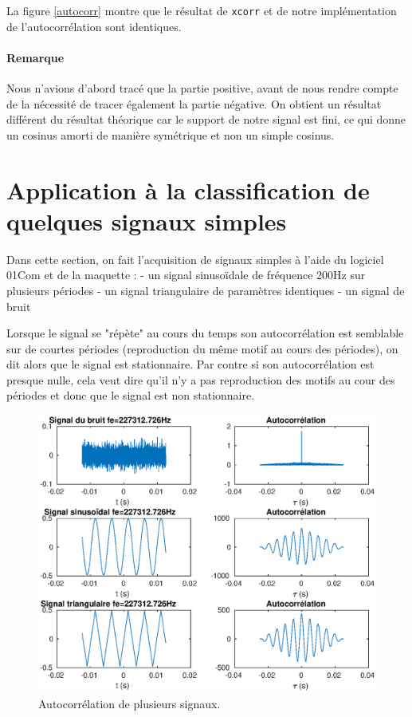 \documentclass[french]{article}
\begin{document}
La figure \ref{autocorr} montre que le résultat de \verb`xcorr` et de notre implémentation de l'autocorrélation sont identiques.

\paragraph{Remarque}
Nous n'avions d'abord tracé que la partie positive, avant de nous rendre compte de la nécessité de tracer également la partie négative.
On obtient un résultat différent du résultat théorique car le support de notre signal est fini, ce qui donne un cosinus amorti de manière symétrique et non un simple cosinus.

\section{ Application à la classification de quelques signaux simples}


Dans cette section, on fait l'acquisition de signaux simples à l'aide du logiciel 01Com et de la maquette : 
- un signal sinusoïdale de fréquence 200Hz sur plusieurs périodes
- un signal triangulaire de paramètres identiques
- un signal de bruit 

Lorsque le signal se "répète" au cours du temps son autocorrélation est semblable sur de courtes périodes (reproduction du même motif au cours des périodes), on dit alors que le signal est stationnaire. Par contre si son autocorrélation est presque nulle, cela veut dire qu'il n'y a pas reproduction des motifs au cour des périodes et donc que le signal est non stationnaire.

\begin{figure}[h!]
	\centering
	\includegraphics[height=0.45\textheight]{images/classificationSig.eps}
	\caption{Autocorrélation de plusieurs signaux.}
	\label{classifSig}
\end{figure}
\end{document}
